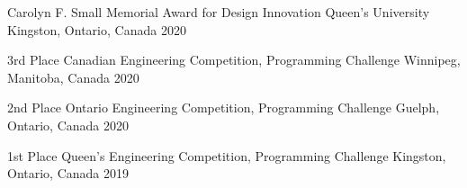 



\begin{cvhonors}


  \cvhonor
    {Carolyn F. Small Memorial Award for Design Innovation} %
    {Queen's University} %
    {Kingston, Ontario, Canada} %
    {2020} %

  \cvhonor
    {3rd Place} %
    {Canadian Engineering Competition, Programming Challenge} %
    {Winnipeg, Manitoba, Canada} %
    {2020} %

  \cvhonor
    {2nd Place} %
    {Ontario Engineering Competition, Programming Challenge} %
    {Guelph, Ontario, Canada} %
    {2020} %

  \cvhonor
    {1st Place} %
    {Queen's Engineering Competition, Programming Challenge} %
    {Kingston, Ontario, Canada} %
    {2019} %
    
\end{cvhonors}